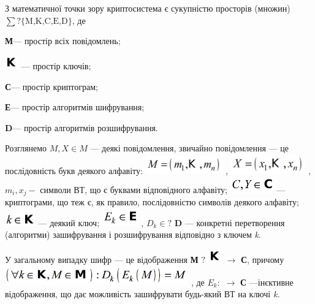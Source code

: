 \bigskip

З математичної точки зору криптосистема є сукупністю просторів (множин)  ${\sum
?\{\text{M,K,C,E,D}\}}$,  де 

\textbf{М}--- простір всіх повідомлень; $ $

 \includegraphics[width=0.2311in,height=0.2311in]{crypt-img/crypt-img5.png}  ---
простір ключів;

\textbf{С}--- простір криптограм;

\textbf{Е}--- простір алгоритмів шифрування;

\textbf{D}--- простір алгоритмів розшифрування.

Розглянемо  $M,X\in M$ --- деякі повідомлення, звичайно повідомлення --- це
послідовність букв  деякого алфавіту: 
\includegraphics[width=1.311in,height=0.3189in]{crypt-img/crypt-img6.png} , 
\includegraphics[width=1.2681in,height=0.3354in]{crypt-img/crypt-img7.png} , 
$m_i,x_j-$ символи ВТ, що є буквами відповідного алфавіту; 
\includegraphics[width=0.739in,height=0.2709in]{crypt-img/crypt-img8.png}  ---
криптограми, що теж є, як правило, послідовністю символів деякого алфавіту; 
\includegraphics[width=0.5193in,height=0.2311in]{crypt-img/crypt-img9.png}  ---
деякий ключ; 
\includegraphics[width=0.6146in,height=0.3016in]{crypt-img/crypt-img10.png} , 
$D_k\in ?$ \textbf{D} --- конкретні перетворення (алгоритми) зашифрування і
розшифрування відповідно з ключем \textit{k}. 

У загальному випадку шифр --- це відображення \textbf{М} $?$
\includegraphics[width=0.2311in,height=0.2311in]{crypt-img/crypt-img11.png} 
$\rightarrow $\textbf{ С}, причому
\includegraphics[width=3.1173in,height=0.3346in]{crypt-img/crypt-img12.png} , 
де   $E_k:$  $\rightarrow $\textbf{ С}
---ін{\textquotesingle}єктивне відображення, що дає можливість зашифрувати 
будь-який ВТ на ключі \textit{k.}


